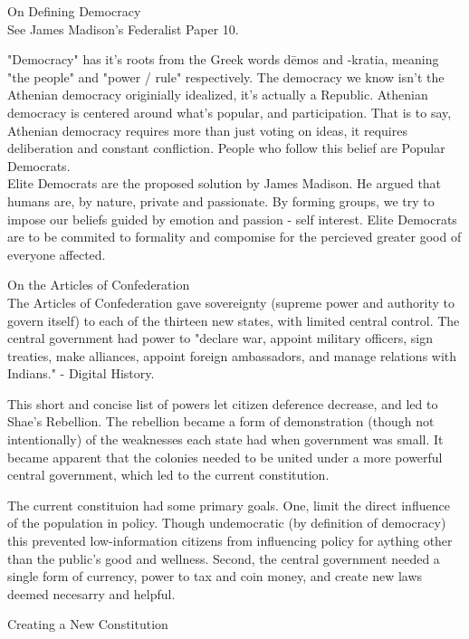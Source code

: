 \documentclass{article}
\begin{document}
\noindent
\Large
On Defining Democracy\\
\normalsize
\noindent
See James Madison's Federalist Paper 10.

\indent
"Democracy" has it's roots from the Greek words d\={e}mos and -kratia, meaning "the people" and "power / rule" respectively. The democracy we know isn't the Athenian democracy originially idealized, it's actually a Republic. Athenian democracy is centered around what's popular, and participation. That is to say, Athenian democracy requires more than just voting on ideas, it requires deliberation and constant confliction. People who follow this belief are Popular Democrats.\\

Elite Democrats are the proposed solution by James Madison. He argued that humans are, by nature, private and passionate. By forming groups, we try to impose our beliefs guided by emotion and passion - self interest. Elite Democrats are to be commited to formality and compomise for the percieved greater good of everyone affected.

\noindent
\Large
On the Articles of Confederation\\
\normalsize
\indent
The Articles of Confederation gave sovereignty (supreme power and authority to govern itself) to each of the thirteen new states, with limited central control. The central government had power to "declare war, appoint military officers, sign treaties, make alliances, appoint foreign ambassadors, and manage relations with Indians." - Digital History.

This short and concise list of powers let citizen deference decrease, and led to Shae's Rebellion. The rebellion became a form of demonstration (though not intentionally) of the weaknesses each state had when government was small. It became apparent that the colonies needed to be united under a more powerful central government, which led to the current constitution.

The current constituion had some primary goals. One, limit the direct influence of the population in policy. Though undemocratic (by definition of democracy) this prevented low-information citizens from influencing policy for aything other than the public's good and wellness. Second, the central government needed a single form of currency, power to tax and coin money, and create new laws deemed necesarry and helpful.

\noindent
\Large
Creating a New Constitution\\
\normalsize
\indent
\end{document}
